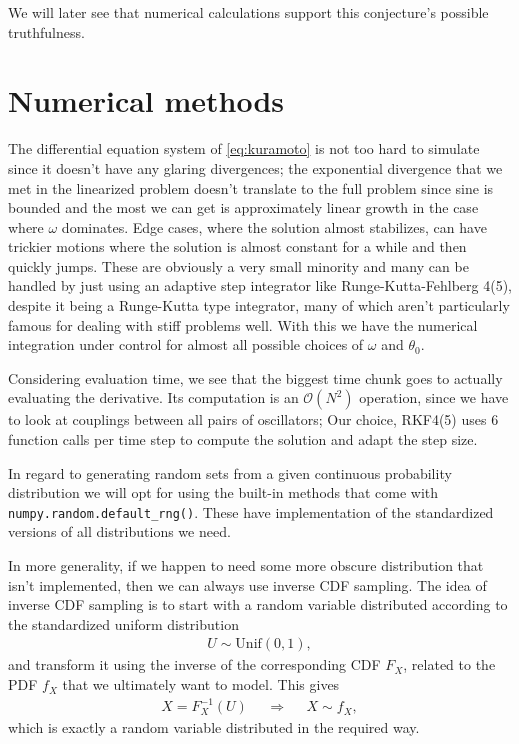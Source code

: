 \documentclass[10pt,a4paper,twocolumn]{article}
\begin{document}
We will later see that numerical calculations support this conjecture's possible truthfulness.







\section{Numerical methods}

The differential equation system of \cref{eq:kuramoto} is not too hard to simulate since it doesn't have any glaring divergences; the exponential divergence that we met in the linearized problem doesn't translate to the full problem since sine is bounded and the most we can get is approximately linear growth in the case where $\omega$ dominates. Edge cases, where the solution almost stabilizes, can have trickier motions where the solution is almost constant for a while and then quickly jumps. These are obviously a very small minority and many can be handled by just using an adaptive step integrator like Runge-Kutta-Fehlberg 4(5), despite it being a Runge-Kutta type integrator, many of which aren't particularly famous for dealing with stiff problems well. With this we have the numerical integration under control for almost all possible choices of $\omega$ and $\theta_0$.

Considering evaluation time, we see that the biggest time chunk goes to actually evaluating the derivative. Its computation is an $\mathcal{O}(N^2)$ operation, since we have to look at couplings between all pairs of oscillators; Our choice, RKF4(5) uses 6 function calls per time step to compute the solution and adapt the step size. \cite{rkf45}

In regard to generating random sets from a given continuous probability distribution we will opt for using the built-in methods that come with \texttt{numpy.random.default\_rng()}. These have implementation of the standardized versions of all distributions we need. 

In more generality, if we happen to need some more obscure distribution that isn't implemented, then we can always use inverse CDF sampling. The idea of inverse CDF sampling is to start with a random variable distributed according to the standardized uniform distribution
%
\begin{align}
    U \sim \mathrm{Unif}(0,1),
\end{align}
%
and transform it using the inverse of the corresponding CDF $F_X$, related to the PDF $f_X$ that we ultimately want to model. This gives
%
\begin{align}
    X = F_X^{-1}(U)& &\Longrightarrow& &X \sim f_X,
\end{align} 
%
which is exactly a random variable distributed in the required way.
\end{document}
